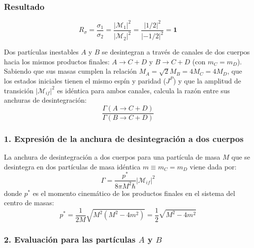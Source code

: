 \begin{problema}
\subsubsection*{Resultado}
\begin{equation*}
R_\sigma = \frac{\sigma_1}{\sigma_2} = \frac{|\mathcal{M}_1|^2}{|\mathcal{M}_2|^2} = \frac{|1/2|^2}{|-1/2|^2} = \mathbf{1}
\end{equation*}
\end{problema}
\newpage
\begin{problema}
Dos partículas inestables $A$ y $B$ se desintegran a través de canales de dos cuerpos hacia los mismos productos finales: $A\rightarrow C+D$ y $B\rightarrow C+D$ (con $m_{C}=m_{D}$). Sabiendo que sus masas cumplen la relación $M_{A}=\sqrt{2}M_{B}=4M_{C}=4M_{D}$, que los estados iniciales tienen el mismo espín y paridad ($J^{P}$) y que la amplitud de transición $|\mathcal{M}_{if}|^{2}$ es idéntica para ambos canales, calcula la razón entre sus anchuras de desintegración:
\begin{equation*}
\frac{\Gamma(A\rightarrow C+D)}{\Gamma(B\rightarrow C+D)}
\end{equation*}

\tcblower

\subsubsection*{1. Expresión de la anchura de desintegración a dos cuerpos}

La anchura de desintegración a dos cuerpos para una partícula de masa $M$ que se desintegra en dos partículas de masa idéntica $m \equiv m_C = m_D$ viene dada por:
\begin{equation*}
\Gamma = \frac{p^*}{8 \pi M^2 \hbar} |\mathcal{M}_{if}|^2
\end{equation*}
donde $p^*$ es el momento cinemático de los productos finales en el sistema del centro de masas:
\begin{equation*}
p^* = \frac{1}{2M} \sqrt{M^2 (M^2 - 4m^2)} = \frac{1}{2} \sqrt{M^2 - 4m^2}
\end{equation*}

\subsubsection*{2. Evaluación para las partículas $A$ y $B$}


\end{problema}
